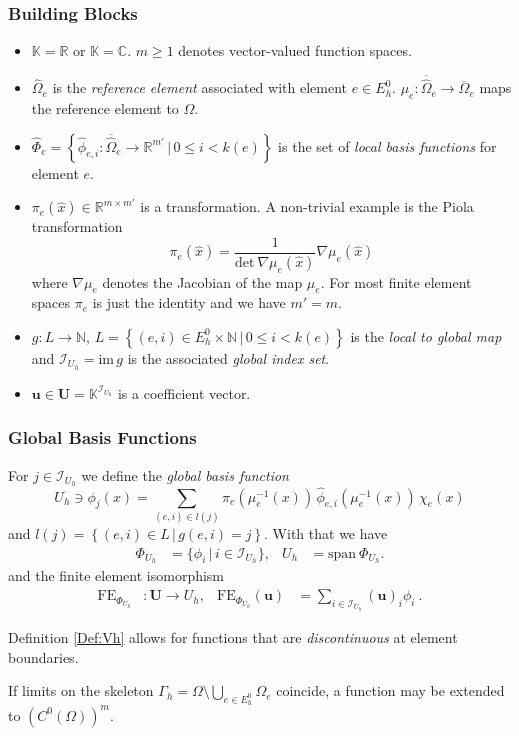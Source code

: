 \begin{frame}
\frametitle{Building Blocks}
\begin{itemize}
\item $\mathbb{K}=\mathbb{R}$ or $\mathbb{K}=\mathbb{C}$.
  $m\geq 1$ denotes vector-valued function spaces. 
\item $\hat\Omega_e$ is the \textit{reference element} associated with
element $e\in E_h^0$. $\mu_e : \overline{\hat\Omega}_e \to
  \overline{\Omega}_e$ maps the reference element to $\Omega$.
\item $\hat\Phi_e
  = \left\{\hat\phi_{e,i}: \overline{\hat\Omega}_e \to \mathbb{R}^{m'}\,|\,0\leq
  i < k(e)\right\}$ is 
  the set of \textit{local basis functions} for element $e$.
\item $\pi_e(\hat{x})\in\mathbb{R}^{m\times m'}$ is a
  transformation. A non-trivial example is the Piola
  transformation \cite{BrezziFortin}
\begin{equation*}
\pi_e(\hat{x}) = \frac{1}{\text{det}\  \nabla\mu_e(\hat{x})} \nabla \mu_e(\hat{x})
\end{equation*}
where $\nabla \mu_e$ denotes the Jacobian of the map $\mu_e$. For most
finite element spaces $\pi_e$ is just the identity and we have $m'=m$.
\item $g : L \to \mathbb{N}$, $L=\left\{ (e,i)\in E_h^0 \times
  \mathbb{N} \,|\, 0\leq i < k(e)\right\}$ is the \textit{local to global map}
  and $\mathcal{I}_{U_h} = \text{im}\,g$ is the associated \textit{global index set}.
\item $\mathbf{u}\in \mathbf{U}=\mathbb{K}^{\mathcal{I}_{U_h}}$ is a coefficient vector.
\end{itemize}
\end{frame}

\begin{frame}
\frametitle{Global Basis Functions}
For $j\in \mathcal{I}_{U_h}$ we define the \textit{global basis function}
\begin{equation*}
U_h \ni \phi_j(x) = \sum_{(e,i)\in l(j)} \pi_e(\mu_e^{-1}(x)) \,
\hat\phi_{e,i}(\mu_e^{-1}(x)) \, \chi_e(x)
\end{equation*} 
and $l(j) = \left\{ (e,i)\in L \,|\, g(e,i)=j \right\}$.
With that we have
\begin{align}
\Phi_{U_h} &= \{\phi_i \,|\, i\in \mathcal{I}_{U_h}\}, & U_h &= \text{span}\ \Phi_{U_h}.
\end{align}
and the finite element isomorphism
\begin{align}\label{Eq:FiniteElementIsomorphism}
\text{FE}_{\Phi_{U_h}} &: \mathbf{U} \to
U_h, & \text{FE}_{\Phi_{U_h}}(\mathbf{u})
&= \sum_{i\in\mathcal{I}_{U_h}} (\mathbf{u})_i \phi_i \ . 
\end{align} 

Definition \ref{Def:Vh} allows for functions that are
\textit{discontinuous} at element boundaries. 

If limits on the skeleton $\Gamma_h = \Omega\setminus \bigcup_ {e\in
  E_h^0} \Omega_e$ coincide, a function may be extended to 
$\left(C^0(\Omega)\right)^m$.
\end{frame}


